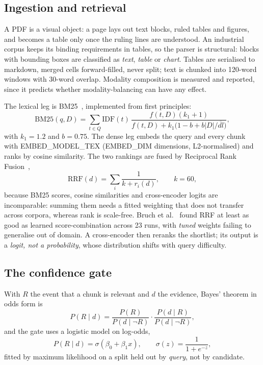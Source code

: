 \documentclass[conference]{IEEEtran}
\begin{document}
\subsection{Ingestion and retrieval}

A PDF is a visual object: a page lays out text blocks, ruled tables and
figures, and becomes a table only once the ruling lines are understood. An
industrial corpus keeps its binding requirements in tables, so the parser is
structural: blocks with bounding boxes are classified as \emph{text},
\emph{table} or \emph{chart}. Tables are serialised to markdown, merged cells
forward-filled, never split; text is chunked into 120-word windows with
30-word overlap. Modality composition is measured and reported, since it
predicts whether modality-balancing can have any effect.

The lexical leg is BM25~\cite{robertson2004prf}, implemented from first
principles:
\begin{equation}
\mathrm{BM25}(q,D)=\sum_{t\in Q}\mathrm{IDF}(t)\,
\frac{f(t,D)(k_1+1)}{f(t,D)+k_1\big(1-b+b|D|/\overline{dl}\big)},
\label{eq:bm25}
\end{equation}
with $k_1=1.2$ and $b=0.75$. The dense leg embeds the query and every chunk
with {{EMBED_MODEL_TEX}} ({{EMBED_DIM}} dimensions, L2-normalised) and ranks by
cosine similarity. The two rankings are fused by Reciprocal Rank
Fusion~\cite{cormack2009rrf},
\begin{equation}
\mathrm{RRF}(d)=\sum_i \frac{1}{k+r_i(d)},\qquad k=60,
\label{eq:rrf}
\end{equation}
because BM25 scores, cosine similarities and cross-encoder logits are
incomparable: summing them needs a fitted weighting that does not transfer
across corpora, whereas rank is scale-free. Bruch et
al.~\cite{bruch2023fusion} found RRF at least as good as learned
score-combination across 23 runs, with \emph{tuned} weights failing to
generalise out of domain. A cross-encoder then reranks the shortlist; its
output is a \emph{logit, not a probability}, whose distribution shifts with
query difficulty.

\subsection{The confidence gate}

With $R$ the event that a chunk is relevant and $d$ the evidence, Bayes'
theorem in odds form is
\begin{equation}
P(R\mid d)=\frac{P(R)}{P(d\mid\neg R)}\cdot\frac{P(d\mid R)}{P(d\mid\neg R)},
\label{eq:bayes}
\end{equation}
and the gate uses a logistic model on log-odds,
\begin{equation}
P(R\mid d)=\sigma(\beta_0+\beta_1 x),\qquad \sigma(z)=\frac{1}{1+e^{-z}},
\label{eq:posterior}
\end{equation}
fitted by maximum likelihood on a split held out by \emph{query}, not by
candidate.
\end{document}
